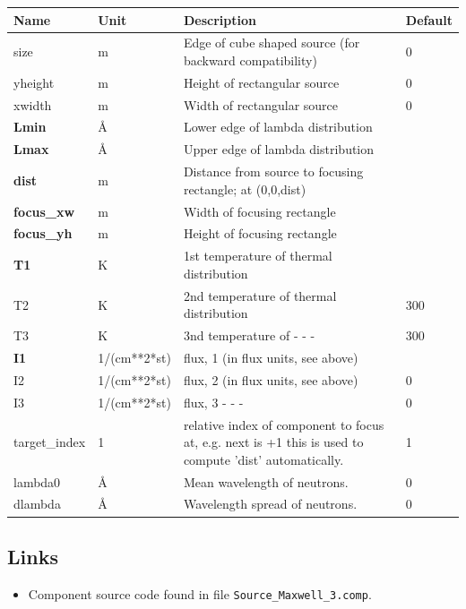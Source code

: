 \begin{longtable}{p{}p{}p{}p{}}
\toprule
\textbf{Name} & \textbf{Unit} & \textbf{Description} & \textbf{Default} \\
\midrule
\endhead
size & m & Edge of cube shaped source (for backward compatibility) & 0 \\
yheight & m & Height of rectangular source & 0 \\
xwidth & m & Width of rectangular source & 0 \\
\textbf{Lmin} & \AA{} & Lower edge of lambda distribution &  \\
\textbf{Lmax} & \AA{} & Upper edge of lambda distribution &  \\
\textbf{dist} & m & Distance from source to focusing rectangle; at (0,0,dist) &  \\
\textbf{focus\_xw} & m & Width of focusing rectangle &  \\
\textbf{focus\_yh} & m & Height of focusing rectangle &  \\
\textbf{T1} & K & 1st temperature of thermal distribution &  \\
T2 & K & 2nd temperature of thermal distribution & 300 \\
T3 & K & 3nd temperature of  - - - & 300 \\
\textbf{I1} & 1/(cm**2*st) & flux, 1 (in flux units, see above) &  \\
I2 & 1/(cm**2*st) & flux, 2 (in flux units, see above) & 0 \\
I3 & 1/(cm**2*st) & flux, 3  - - - & 0 \\
target\_index & 1 & relative index of component to focus at, e.g. next is +1 this is used to compute 'dist' automatically. & 1 \\
lambda0 & \AA{} & Mean wavelength of neutrons. & 0 \\
dlambda & \AA{} & Wavelength spread of neutrons. & 0 \\
\bottomrule
\end{longtable}

\subsection*{Links}
\begin{itemize}
  \item Component source code found in file \texttt{Source\_Maxwell\_3.comp}.
\end{itemize}
